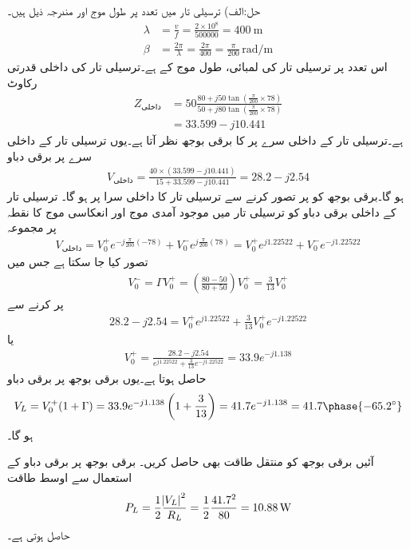 حل:الف) ترسیلی تار میں  تعدد پر  طول موج اور  مندرجہ ذیل ہیں۔
\begin{align*}
\lambda&=\frac{v}{f}=\frac{2\times 10^8}{500000}=\SI{400}{\meter}\\
\beta&=\frac{2\pi}{\lambda}=\frac{2\pi}{400}=\frac{\pi}{200} \, \si{\radian\per\meter}
\end{align*}
اس تعدد پر ترسیلی تار کی لمبائی، طول موج  کے  ہے۔ترسیلی تار  کی داخلی قدرتی رکاوٹ
\begin{align*}
Z_{\text{داخلی}} &= 50 \frac{80+j 50 \tan (\frac{\pi}{200} \times 78)}{50+j 80 \tan (\frac{\pi}{200} \times 78)}\\
&=33.599-j 10.441
\end{align*}
ہے۔ترسیلی تار کے داخلی سرے پر  کا برقی بوجھ  نظر آتا ہے۔یوں ترسیلی تار کے داخلی سرے پر برقی دباو
\begin{align*}
V_{\text{داخلی}}=\frac{40 \times (33.599-j 10.441)}{15+33.599-j 10.441}=28.2-j 2.54
\end{align*}
ہو گا۔برقی بوجھ کو  پر تصور کرنے سے  ترسیلی تار  کا داخلی سرا  پر ہو گا۔ ترسیلی تار کے داخلی برقی دباو کو ترسیلی تار میں موجود آمدی موج  اور انعکاسی موج  کا نقطہ  پر مجموعہ
\begin{align*}
V_{\text{داخلی}} = V_0^+ e^{-j \frac{\pi}{200} (-78)}+V_0^- e^{j \frac{\pi}{200} (78)} = V_0^+ e^{j 1.22522}+V_0^- e^{-j 1.22522}
\end{align*}
 تصور کیا جا سکتا ہے جس میں
\begin{align*}
V_0^-=\Gamma V_0^+=\left(\frac{80-50}{80+50} \right) V_0^+=\frac{3}{13} V_0^+
\end{align*}
پر کرنے سے
\begin{align*}
28.2-j 2.54 = V_0^+ e^{j 1.22522}+\frac{3}{13} V_0^+ e^{-j 1.22522}
\end{align*}
یا
\begin{align*}
V_0^+=\frac{28.2-j 2.54}{e^{j 1.22522}+\frac{3}{13} e^{-j 1.22522}}=33.9 e^{-j 1.138}
\end{align*}
حاصل ہوتا ہے۔یوں برقی بوجھ پر برقی دباو
\begin{align*}
V_L=V_0^+(1+\Gamma) = 33.9 e^{-j 1.138} \left(1+\frac{3}{13}\right)=41.7 e^{-j 1.138}=41.7 \phase{-65.2^{\circ}}
\end{align*}
ہو گا۔

آئیں برقی بوجھ کو منتقل طاقت بھی حاصل کریں۔ برقی بوجھ پر برقی دباو  کے استعمال سے اوسط طاقت
\begin{align*}
P_L=\frac{1}{2} \frac{\abs{V_L}^2}{R_L}=\frac{1}{2} \frac{41.7^2}{80}=\SI{10.88}{\watt}
\end{align*}
حاصل ہوتی ہے۔


